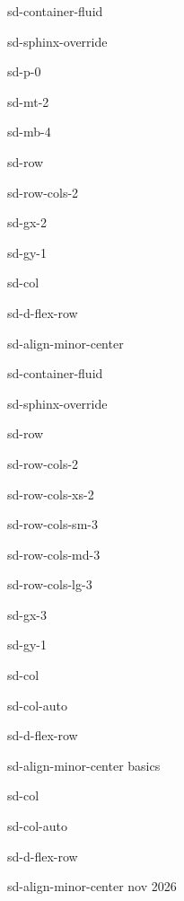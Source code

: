 \documentclass[letterpaper,10pt,italian]{jupyterBook}
\begin{document}
\begin{sphinxuseclass}{sd-container-fluid}
\begin{sphinxuseclass}{sd-sphinx-override}
\begin{sphinxuseclass}{sd-p-0}
\begin{sphinxuseclass}{sd-mt-2}
\begin{sphinxuseclass}{sd-mb-4}
\begin{sphinxuseclass}{sd-row}
\begin{sphinxuseclass}{sd-row-cols-2}
\begin{sphinxuseclass}{sd-gx-2}
\begin{sphinxuseclass}{sd-gy-1}
\begin{sphinxuseclass}{sd-col}
\begin{sphinxuseclass}{sd-d-flex-row}
\begin{sphinxuseclass}{sd-align-minor-center}
\begin{sphinxuseclass}{sd-container-fluid}
\begin{sphinxuseclass}{sd-sphinx-override}
\begin{sphinxuseclass}{sd-row}
\begin{sphinxuseclass}{sd-row-cols-2}
\begin{sphinxuseclass}{sd-row-cols-xs-2}
\begin{sphinxuseclass}{sd-row-cols-sm-3}
\begin{sphinxuseclass}{sd-row-cols-md-3}
\begin{sphinxuseclass}{sd-row-cols-lg-3}
\begin{sphinxuseclass}{sd-gx-3}
\begin{sphinxuseclass}{sd-gy-1}
\begin{sphinxuseclass}{sd-col}
\begin{sphinxuseclass}{sd-col-auto}
\begin{sphinxuseclass}{sd-d-flex-row}
\begin{sphinxuseclass}{sd-align-minor-center}
\sphinxAtStartPar
basics

\end{sphinxuseclass}
\end{sphinxuseclass}
\end{sphinxuseclass}
\end{sphinxuseclass}
\begin{sphinxuseclass}{sd-col}
\begin{sphinxuseclass}{sd-col-auto}
\begin{sphinxuseclass}{sd-d-flex-row}
\begin{sphinxuseclass}{sd-align-minor-center}
 nov 2026


\end{sphinxuseclass}
\end{sphinxuseclass}
\end{sphinxuseclass}
\end{sphinxuseclass}
\end{sphinxuseclass}
\end{sphinxuseclass}
\end{sphinxuseclass}
\end{sphinxuseclass}
\end{sphinxuseclass}
\end{sphinxuseclass}
\end{sphinxuseclass}
\end{sphinxuseclass}
\end{sphinxuseclass}
\end{sphinxuseclass}
\end{sphinxuseclass}
\end{sphinxuseclass}
\end{sphinxuseclass}
\end{sphinxuseclass}
\end{sphinxuseclass}
\end{sphinxuseclass}
\end{sphinxuseclass}
\end{sphinxuseclass}
\end{sphinxuseclass}
\end{sphinxuseclass}
\end{sphinxuseclass}
\end{sphinxuseclass}
\end{document}
